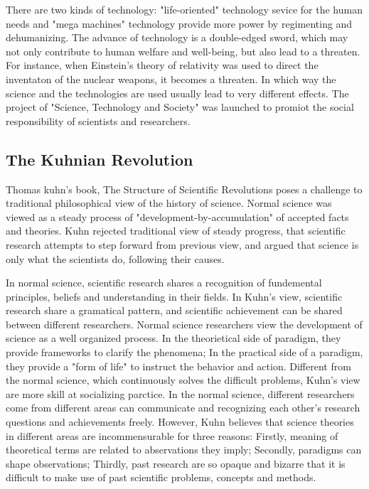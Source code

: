 \documentclass[18pt]{article}
\begin{document}
There are two kinds of technology: "life-oriented" technology sevice for the human needs 
and "mega machines" technology provide more power by regimenting and dehumanizing\cite{sismondo2010introduction}. 
The advance of technology is a double-edged sword, which may not only contribute to human welfare and well-being,
but also lead to a threaten. For instance, when Einstein's theory of relativity was used to direct
the inventaton of the nuclear weapons, it becomes a threaten. In which way the science and the technologies 
are used usually lead to very different effects. 
The project of "Science, Technology and Society" was launched to promiot the social responsibility of scientists and researchers.

\subsection{The Kuhnian Revolution}
Thomas kuhn's book, The Structure of Scientific Revolutions poses a challenge to 
traditional philosophical view of the history of science.
Normal science was viewed as a steady process of "development-by-accumulation"\cite{hellter} of accepted facts and theories.
Kuhn rejected traditional view of steady progress, that scientific research attempts to step forward from previous view,
and argued that science is only what the scientists do, following their causes.

In normal science, scientific research shares a recognition of fundemental principles, beliefs and understanding in their fields. 
In Kuhn's view, scientific research share a gramatical pattern, and scientific achievement
can be shared between different researchers.
Normal science researchers view the development of science as a well organized process. 
In the theorietical side of paradigm, they provide frameworks to clarify the phenomena;
In the practical side of a paradigm, they provide a "form of life" to instruct the behavior and action.
Different from the normal science, which continuously solves the difficult problems,
Kuhn's view are more skill at socializing parctice. 
In the normal science, different researchers come from different areas can communicate and recognizing 
each other's research questions and achievements freely. However, Kuhn believes that science theories in different
areas are incommensurable for three reasons: 
Firstly, meaning of theoretical terms are related to abservations they imply;
Secondly, paradigms can shape observations;
Thirdly, past research are so opaque and bizarre that it is difficult to make use of past scientific problems,
concepts and methods.
\end{document}
